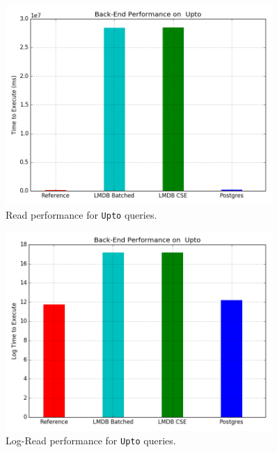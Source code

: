 \documentclass[12pt,a4paper,twoside,openright]{report}
\newcommand\codeName[1]{\texttt{#1}}
\begin{document}
\begin{figure}[ht]
\centering
  \includegraphics[width=0.9\textwidth]{scripts/Upto.png}
  \caption{Read performance for \codeName{Upto} queries.}
  \label{fig:UptoTestResult}
\end{figure}

 \begin{figure}[ht]
\centering
  \includegraphics[width=0.9\textwidth]{scripts/UptoLog.png}
  \caption{Log-Read performance for \codeName{Upto} queries.}
  \label{fig:UptoLogResult}
\end{figure}
\end{document}
